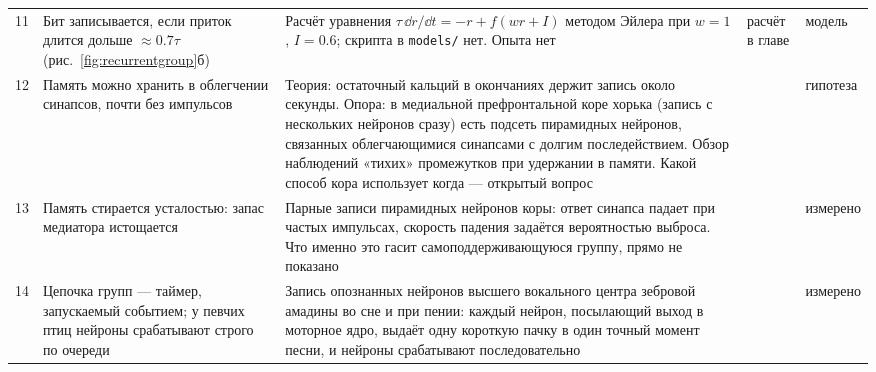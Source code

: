 {\begin{longtable}{>{\raggedright}p{0.5cm}>{\raggedright}p{4.0cm}>{\raggedright}p{5.6cm}>{\raggedright}p{2.3cm}>{\raggedright\arraybackslash}p{1.7cm}}
11 & Бит записывается, если приток длится дольше $\approx0.7\tau$ (рис.~\ref{fig:recurrentgroup}б) & Расчёт уравнения $\tau\,\dd r/\dd t=-r+f(wr+I)$ методом Эйлера при $w=1$, $I=0.6$; скрипта в \texttt{models/} нет. Опыта нет & расчёт в главе & модель \\
12 & Память можно хранить в облегчении синапсов, почти без импульсов & Теория: остаточный кальций в окончаниях держит запись около секунды. Опора: в медиальной префронтальной коре хорька (запись с нескольких нейронов сразу) есть подсеть пирамидных нейронов, связанных облегчающимися синапсами с долгим последействием. Обзор наблюдений «тихих» промежутков при удержании в памяти. Какой способ кора использует когда --- открытый вопрос & \cite{Mongillo2008,WangMarkram2006,Stokes2015} & гипотеза \\
13 & Память стирается усталостью: запас медиатора истощается & Парные записи пирамидных нейронов коры: ответ синапса падает при частых импульсах, скорость падения задаётся вероятностью выброса. Что именно это гасит самоподдерживающуюся группу, прямо не показано & \cite{Tsodyks1997} & измерено \\
14 & Цепочка групп --- таймер, запускаемый событием; у певчих птиц нейроны срабатывают строго по очереди & Запись опознанных нейронов высшего вокального центра зебровой амадины во сне и при пении: каждый нейрон, посылающий выход в моторное ядро, выдаёт одну короткую пачку в один точный момент песни, и нейроны срабатывают последовательно & \cite{Hahnloser2002} & измерено \\
\bottomrule
\end{longtable}}
